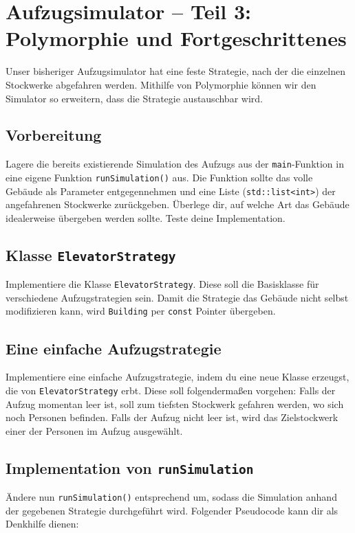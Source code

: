 \section{\ExercisePrefixElevator Aufzugsimulator -- Teil 3: Polymorphie und Fortgeschrittenes \optional}

\optionaltextbox

Unser bisheriger Aufzugsimulator hat eine feste Strategie, nach der die einzelnen Stockwerke abgefahren werden.
Mithilfe von Polymorphie können wir den Simulator so erweitern, dass die Strategie austauschbar wird.  

\subsection{Vorbereitung}
Lagere die bereits existierende Simulation des Aufzugs aus der \lstinline{main}-Funktion in eine eigene Funktion \lstinline{runSimulation()} aus.
Die Funktion sollte das volle Gebäude als Parameter entgegennehmen und eine Liste (\lstinline{std::list<int>}) der angefahrenen Stockwerke zurückgeben.
Überlege dir, auf welche Art das Gebäude idealerweise übergeben werden sollte.
Teste deine Implementation.

\subsection{Klasse \lstinline{ElevatorStrategy}}
Implementiere die Klasse \lstinline{ElevatorStrategy}.
Diese soll die Basisklasse für verschiedene Aufzugstrategien sein.
Damit die Strategie das Gebäude nicht selbst modifizieren kann, wird \lstinline{Building} per \lstinline{const} Pointer übergeben.


\subsection{Eine einfache Aufzugstrategie}
Implementiere eine einfache Aufzugstrategie, indem du eine neue Klasse erzeugst, die von \lstinline{ElevatorStrategy} erbt.
Diese soll folgendermaßen vorgehen: 
Falls der Aufzug momentan leer ist, soll zum tiefsten Stockwerk gefahren werden, wo sich noch Personen befinden.
Falls der Aufzug nicht leer ist, wird das Zielstockwerk einer der Personen im Aufzug ausgewählt.

\subsection{Implementation von \lstinline{runSimulation}}
Ändere nun \lstinline{runSimulation()} entsprechend um, sodass die Simulation anhand der gegebenen Strategie durchgeführt wird.
Folgender Pseudocode kann dir als Denkhilfe dienen:


